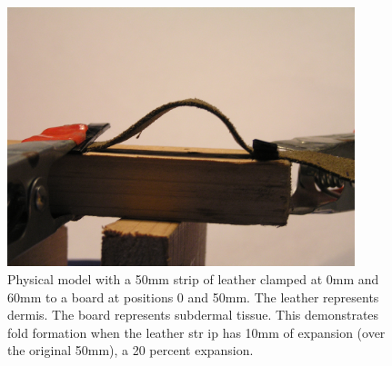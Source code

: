 %

\begin{figure}[!h]
  \centering
   \includegraphics[width=0.9\textwidth]{images/P1010005.JPG}
  \caption{Physical model with a 50mm strip of leather clamped at 0mm and 60mm to a board at positions 0 and 50mm. The leather represents dermis. The board represents subdermal tissue. This demonstrates fold formation when the leather str
ip has 10mm of expansion (over the original 50mm), a 20 percent expansion.}
  \label{fig:model3}
\end{figure}

%


